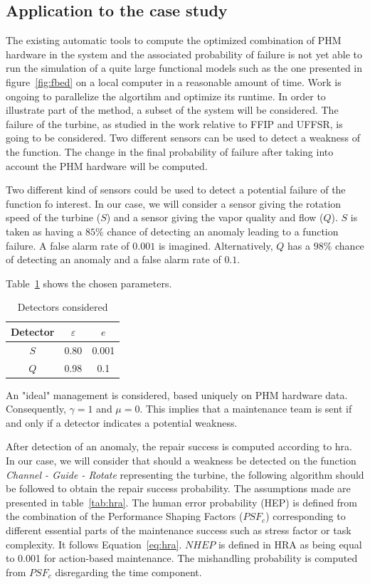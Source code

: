 \subsection{Application to the case study}

The existing automatic tools to compute the optimized combination of PHM hardware in the system and the associated probability of failure is not yet able to run the simulation of a quite large functional models such as the one presented in figure~\ref{fig:fbed} on a local computer in a reasonable amount of time. Work is ongoing to parallelize the algortihm and optimize its runtime. In order to illustrate part of the method, a subset of the system will be considered. The failure of the turbine, as studied in the work relative to FFIP and UFFSR, is going to be considered. Two different sensors can be used to detect a weakness of the function. The change in the final probability of failure after taking into account the PHM hardware will be computed.

Two different kind of sensors could be used to detect a potential failure of the function fo interest. In our case, we will consider a sensor giving the rotation speed of the turbine ($S$) and a sensor giving the vapor quality and flow ($Q$). $S$ is taken as having a $85\%$ chance of detecting an anomaly leading to a function failure. A false alarm rate of $0.001$ is imagined. Alternatively, $Q$ has a $98\%$ chance of detecting an anomaly and a false alarm rate of $0.1$.

Table~\ref{tab:astrid_det} shows the chosen parameters.

\begin{table}[t]
\centering
\caption{Detectors considered}
\label{tab:astrid_det}
\begin{tabular}{|c|c|c|}
\hline
Detector & $\varepsilon$ & $e$   \\ \hline
$S$      & 0.80          & 0.001 \\ \hline
$Q$      & 0.98          & 0.1   \\ \hline
\end{tabular}
\end{table}

An "ideal" management is considered, based uniquely on PHM hardware data. Consequently, $\gamma = 1$ and $\mu = 0$. This implies that a maintenance team is sent if and only if a detector indicates a potential weakness.

After detection of an anomaly, the repair success is computed according to \gls{hra}. In our case, we will consider that should a weakness be detected on the function \textit{Channel - Guide - Rotate} representing the turbine, the following algorithm should be followed to obtain the repair success probability. The assumptions made are presented in table~\ref{tab:hra}. The human error probability (HEP) is defined from the combination of the Performance Shaping Factors ($PSF_c$) corresponding to different essential parts of the maintenance success such as stress factor or task complexity. It follows Equation~\ref{eq:hra}. $NHEP$ is defined in HRA as being equal to 0.001 for action-based maintenance. The mishandling probability is computed from $PSF_c$ disregarding the time component.

